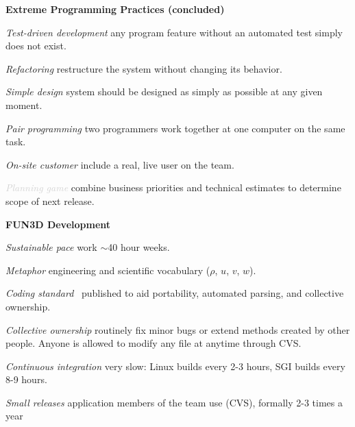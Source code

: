 \documentclass[landscape]{slides}
\renewcommand{\title}[1]{{\large\bfseries #1}}
\newenvironment{itemiz}%
  {\begin{list}{}{\raggedright
      \setlength{\itemsep}{2pt}%
      \setlength{\parskip}{4pt}\setlength{\parsep}{2pt}}}%
  {\end{list}}%
\begin{document}
 \begin{slide}
  \title{Extreme Programming Practices \small(concluded)}
  \begin{itemiz}
    \item[\textcolor{mediumGray}{\textit{Test-driven development}}]
      {\small any program feature without an automated test simply does
	not exist.}
    \item[\textcolor{mediumGray}{\textit{Refactoring}}]
      {\small restructure the system without
	changing its behavior.}
    \item[\textcolor{mediumGray}{\textit{Simple design}}]
      {\small system should be designed as simply as possible at any
	given moment.}
    \item[\textcolor{mediumGray}{\textit{Pair programming}}]
      {\small two programmers work together at one computer on the same
	task.}
    \item[\textcolor{mediumGray}{\textit{On-site customer}}]
      {\small include a real, live user on the team.}  
    \item[\textcolor{lightGray}{\textit{Planning game}}]
      {\small combine business priorities and technical estimates to
	determine scope of next release.}
  \end{itemiz}
 \end{slide}

 \begin{slide}
  \title{FUN3D Development}
  \begin{itemiz}
    \item[\textit{Sustainable pace}]
      {\small work $\sim$40 hour weeks.}
    \item[\textit{Metaphor}]
      {\small engineering and scientific vocabulary ($\rho$, $u$, $v$, $w$).}
    \item[\textit{Coding standard}]
      {\small\ published to aid portability, automated parsing,
               and collective ownership.}
    \item[\textit{Collective ownership}]
      {\small routinely fix minor bugs or extend methods created 
	by other people. Anyone is allowed to modify any file at 
	anytime through CVS.}
    \item[\textit{Continuous integration}]
      {\small very slow: Linux builds every 2-3 hours, 
	SGI builds every 8-9 hours.}
    \item[\textcolor{mediumGray}{\textit{Small releases}}]
      {\small application members of the team use (CVS), 
              formally 2-3 times a year}
   \end{itemiz}
 \end{slide}
  
\end{document}
